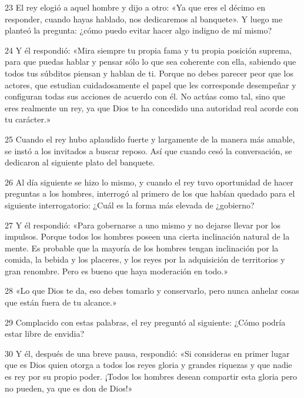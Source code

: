 \par 23 El rey elogió a aquel hombre y dijo a otro: «Ya que eres el décimo en responder, cuando hayas hablado, nos dedicaremos al banquete». Y luego me planteó la pregunta: ¿cómo puedo evitar hacer algo indigno de mí mismo?

\par 24 Y él respondió: «Mira siempre tu propia fama y tu propia posición suprema, para que puedas hablar y pensar sólo lo que sea coherente con ella, sabiendo que todos tus súbditos piensan y hablan de ti. Porque no debes parecer peor que los actores, que estudian cuidadosamente el papel que les corresponde desempeñar y configuran todas sus acciones de acuerdo con él. No actúas como tal, sino que eres realmente un rey, ya que Dios te ha concedido una autoridad real acorde con tu carácter.»

\par 25 Cuando el rey hubo aplaudido fuerte y largamente de la manera más amable, se instó a los invitados a buscar reposo. Así que cuando cesó la conversación, se dedicaron al siguiente plato del banquete.

\par 26 Al día siguiente se hizo lo mismo, y cuando el rey tuvo oportunidad de hacer preguntas a los hombres, interrogó al primero de los que habían quedado para el siguiente interrogatorio: ¿Cuál es la forma más elevada de ¿gobierno?

\par 27 Y él respondió: «Para gobernarse a uno mismo y no dejarse llevar por los impulsos. Porque todos los hombres poseen una cierta inclinación natural de la mente. Es probable que la mayoría de los hombres tengan inclinación por la comida, la bebida y los placeres, y los reyes por la adquisición de territorios y gran renombre. Pero es bueno que haya moderación en todo.»

\par 28 «Lo que Dios te da, eso debes tomarlo y conservarlo, pero nunca anhelar cosas que están fuera de tu alcance.»

\par 29 Complacido con estas palabras, el rey preguntó al siguiente: ¿Cómo podría estar libre de envidia?

\par 30 Y él, después de una breve pausa, respondió: «Si consideras en primer lugar que es Dios quien otorga a todos los reyes gloria y grandes riquezas y que nadie es rey por su propio poder. ¡Todos los hombres desean compartir esta gloria pero no pueden, ya que es don de Dios!»

